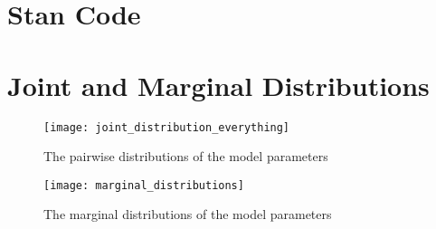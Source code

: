 \documentclass[12pt]{article}
\begin{document}
\clearpage
\appendix
\section{Stan Code} \label{sec:stan}


\section{Joint and Marginal Distributions} \label{sec:parameters}
\begin{figure}
    \centering
    \texttt{[image: joint\_distribution\_everything]}
    \caption{The pairwise distributions of the model parameters}
    \label{fig:joint-distributions}
\end{figure}
\begin{figure}
    \centering
    \texttt{[image: marginal\_distributions]}
    \caption{The marginal distributions of the model parameters}
    \label{fig:joint-distributions}
\end{figure}
\end{document}
